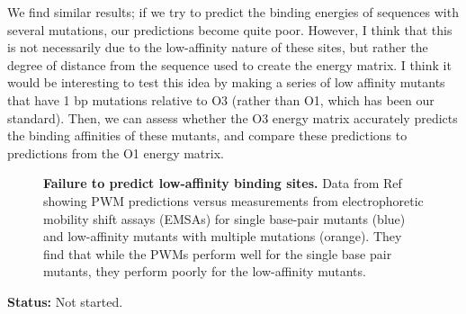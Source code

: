 \documentclass[10pt,letterpaper]{article}
\begin{document}
\noindent We find similar results; if we try to predict the binding energies of sequences with several mutations, our predictions become quite poor. However, I think that this is not necessarily due to the low-affinity nature of these sites, but rather the degree of distance from the sequence used to create the energy matrix. I think it would be interesting to test this idea by making a series of low affinity mutants that have 1 bp mutations relative to O3 (rather than O1, which has been our standard). Then, we can assess whether the O3 energy matrix accurately predicts the binding affinities of these mutants, and compare these predictions to predictions from the O1 energy matrix. \\

\begin{figure}[ht!]
\begin{center}
\caption{\textbf{Failure to predict low-affinity binding sites.} Data from Ref \cite{Siebert2016} showing PWM predictions versus measurements from electrophoretic mobility shift assays (EMSAs) for single base-pair mutants (blue) and low-affinity mutants with multiple mutations (orange). They find that while the PWMs perform well for the single base pair mutants, they perform poorly for the low-affinity mutants.}
\label{fig:low_affinity}
\end{center}
\end{figure}

\noindent \textbf{Status:} Not started.
\end{document}
